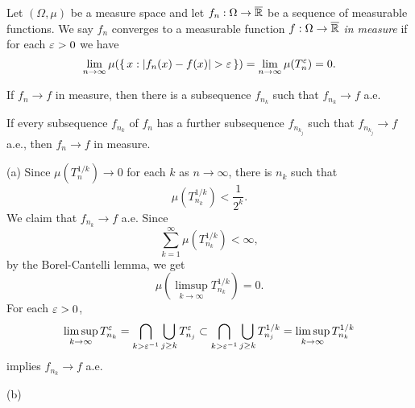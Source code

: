 \documentclass{../note}
\begin{document}
\begin{prb}
Let $(\Omega,\mu)$ be a measure space and let $f_n:\Omega\to\overline{\mathbb{R}}$ be a sequence of measurable functions.
We say $f_n$ converges to a measurable function $f:\Omega\to\overline{\mathbb{R}}$ \emph{in measure} if for each $\varepsilon>0$ we have
\[\lim_{n\to\infty}\mu(\{\,x:|f_n(x)-f(x)|>\e\,\})=\lim_{n\to\infty}\mu(T_n^\e)=0.\]
\begin{parts}
\item If $f_n\to f$ in measure, then there is a subsequence $f_{n_k}$ such that $f_{n_k}\to f$ a.e.
\item If every subsequence $f_{n_k}$ of $f_n$ has a further subsequence $f_{n_{k_j}}$ such that $f_{n_{k_j}}\to f$ a.e., then $f_n\to f$ in measure.
\end{parts}
\end{prb}
\begin{pf}
(a)
Since $\mu(T_n^{1/k})\to0$ for each $k$ as $n\to\infty$, there is $n_k$ such that
\[\mu(T_{n_k}^{1/k})<\frac1{2^k}.\]
We claim that $f_{n_k}\to f$ a.e.
Since
\[\sum_{k=1}^\infty\mu(T_{n_k}^{1/k})<\infty,\]
by the Borel-Cantelli lemma, we get
\[\mu(\limsup_{k\to\infty}T_{n_k}^{1/k})=0.\]
For each $\varepsilon>0$,
\[\limsup_{k\to\infty}T_{n_k}^\varepsilon=\bigcap_{k>\varepsilon^{-1}}\bigcup_{j\ge k}T_{n_j}^\varepsilon\subset\bigcap_{k>\varepsilon^{-1}}\bigcup_{j\ge k}T_{n_j}^{1/k}=\limsup_{k\to\infty}T_{n_k}^{1/k}\]
implies $f_{n_k}\to f$ a.e.

(b)
\end{pf}
\end{document}
